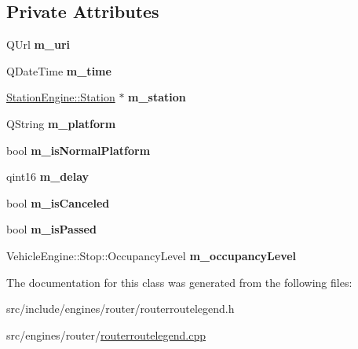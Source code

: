 \subsection*{Private Attributes}
\begin{DoxyCompactItemize}
\item 
\mbox{\label{classRouterEngine_1_1RouteLegEnd_ad3d85af3fde972892bdd47239a402bd5}} 
Q\+Url {\bfseries m\+\_\+uri}
\item 
\mbox{\label{classRouterEngine_1_1RouteLegEnd_a63593b8c83639b2afad706a12bfeafa1}} 
Q\+Date\+Time {\bfseries m\+\_\+time}
\item 
\mbox{\label{classRouterEngine_1_1RouteLegEnd_ad8d8b12f9ea85211e3cf61939f9c3757}} 
\mbox{\hyperlink{classStationEngine_1_1Station}{Station\+Engine\+::\+Station}} $\ast$ {\bfseries m\+\_\+station}
\item 
\mbox{\label{classRouterEngine_1_1RouteLegEnd_a2365b77544223ce133f77a9b5d64435c}} 
Q\+String {\bfseries m\+\_\+platform}
\item 
\mbox{\label{classRouterEngine_1_1RouteLegEnd_a229d67e5fc1a6085f445d6413a7a6079}} 
bool {\bfseries m\+\_\+is\+Normal\+Platform}
\item 
\mbox{\label{classRouterEngine_1_1RouteLegEnd_a91b8ffd54ecdc215cd4a1e7dfc2b4f96}} 
qint16 {\bfseries m\+\_\+delay}
\item 
\mbox{\label{classRouterEngine_1_1RouteLegEnd_a33d2a432407bc94aa1dd3a6b5a062611}} 
bool {\bfseries m\+\_\+is\+Canceled}
\item 
\mbox{\label{classRouterEngine_1_1RouteLegEnd_a8c9e800864e99015e3e7a8f7ba2c8601}} 
bool {\bfseries m\+\_\+is\+Passed}
\item 
\mbox{\label{classRouterEngine_1_1RouteLegEnd_ad4ebf526d4f94ae30418613e7eeb2b9d}} 
Vehicle\+Engine\+::\+Stop\+::\+Occupancy\+Level {\bfseries m\+\_\+occupancy\+Level}
\end{DoxyCompactItemize}


The documentation for this class was generated from the following files\+:\begin{DoxyCompactItemize}
\item 
src/include/engines/router/routerroutelegend.\+h\item 
src/engines/router/\mbox{\hyperlink{routerroutelegend_8cpp}{routerroutelegend.\+cpp}}\end{DoxyCompactItemize}
